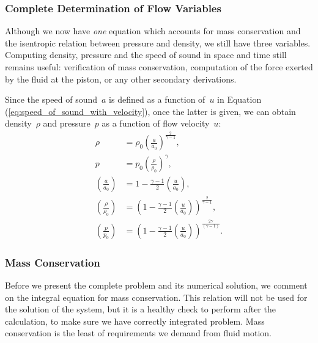 \documentclass[../../thesis.tex]{subfiles}
\begin{document}
\subsubsection{Complete Determination of Flow Variables}
Although we now have \textit{one} equation which accounts for mass conservation and the isentropic relation between pressure and density, we still have three variables. 
Computing density, pressure and the speed of sound in space and time still remains useful: 
verification of mass conservation, computation of the force exerted by the fluid at the piston, or any other secondary derivations.

Since the speed of sound~$a$ is defined as a function of~$u$ in Equation (\ref{eq:speed_of_sound_with_velocity}),
once the latter is given, we can obtain density~$\rho$ and pressure~$p$ as a function of flow velocity~$u$:
\begin{subequations}
    \begin{align}
        \rho &= \rho_0 \left(\frac{a}{a_0}\right)^{\frac{2}{\gamma-1}},
        \\
        p    &= p_0 \left(\frac{\rho}{\rho_0}\right)^{\gamma},
        \\[2mm]
        \left(\frac{a}{a_0}\right) &= 1 - \frac{\gamma-1}{2}\left(\frac{u}{a_0}\right), 
        \\[2mm]
        \left(\frac{\rho}{\rho_0}\right) &= \left(1 - \frac{\gamma-1}{2}\left(\frac{u}{a_0}\right)\right)^{\frac{2}{\gamma-1}},
        \label{eq:density_as_a_function_of_speed}
        \\[2mm]
        \left(\frac{p}{p_0}\right) &= \left(1 - \frac{\gamma-1}{2}\left(\frac{u}{a_0}\right)\right)^{\frac{2\gamma}{\left(\gamma-1\right)}}.
    \end{align}
\end{subequations}

\subsubsection{Mass Conservation}
Before we present the complete problem and its numerical solution, we comment 
on the integral equation for mass conservation.
This relation will not be used for the solution of the system, but it is a 
healthy check to perform after the calculation, to make sure we have 
correctly integrated problem.
Mass conservation is the least of requirements we demand from fluid motion.
\end{document}
